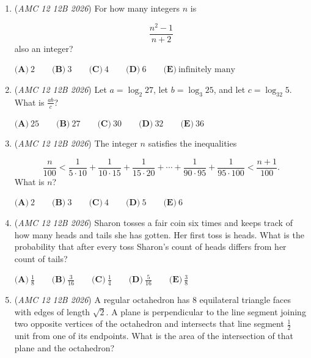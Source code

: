 \begin{enumerate}
	\item (\textit{AMC 12 12B 2026}) For how many integers $n$ is

 \[\frac{n^{2}-1}{n+2}\]
also an integer?


 $\textbf{(A)}\   2  \qquad                 \textbf{(B)}\   3  \qquad                 \textbf{(C)}\   4  \qquad                 \textbf{(D)}\   6  \qquad                 \textbf{(E)}\   \text{infinitely many}$


	\item (\textit{AMC 12 12B 2026}) Let $a = \log_{2}27$, let $b = \log_{3}25$, and let $c = \log_{32}5$. What is $\frac{ab}{c}$?


 $\textbf{(A)}\   25  \qquad                 \textbf{(B)}\   27  \qquad                 \textbf{(C)}\   30  \qquad                 \textbf{(D)}\   32  \qquad                 \textbf{(E)}\   36$


	\item (\textit{AMC 12 12B 2026}) The integer $n$ satisfies the inequalities

 \[\frac{n}{100} < \frac{1}{5 \cdot 10} + \frac{1}{10 \cdot 15} + \frac{1}{15 \cdot 20} + \cdots + \frac{1}{90\cdot 95} + \frac{1}{95\cdot 100} < \frac{n+1}{100}.\]
What is $n$?


 $\textbf{(A)}\   2  \qquad                 \textbf{(B)}\   3  \qquad                 \textbf{(C)}\   4  \qquad                 \textbf{(D)}\   5  \qquad                 \textbf{(E)}\   6$


	\item (\textit{AMC 12 12B 2026}) Sharon tosses a fair coin six times and keeps track of how many heads and tails she has gotten. Her first toss is heads. What is the probability that after every toss Sharon's count of heads differs from her count of tails?


 $\textbf{(A)}\   \frac{1}{8}  \qquad                 \textbf{(B)}\   \frac{3}{16}  \qquad                 \textbf{(C)}\   \frac{1}{4}  \qquad                 \textbf{(D)}\   \frac{5}{16}  \qquad                 \textbf{(E)}\   \frac{3}{8}$


	\item (\textit{AMC 12 12B 2026}) A regular octahedron has $8$ equilateral triangle faces with edges of length $\sqrt{2}$. A plane is perpendicular to the line segment joining two opposite vertices of the octahedron and intersects that line segment $\frac{1}{2}$ unit from one of its endpoints. What is the area of the intersection of that plane and the octahedron?



\end{enumerate}
